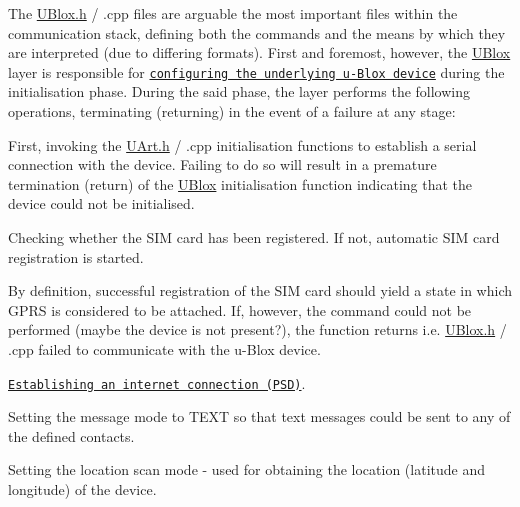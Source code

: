 The \hyperlink{_u_blox_8h}{U\+Blox.\+h} / .cpp files are arguable the most important files within the communication stack, defining both the commands and the means by which they are interpreted (due to differing formats). First and foremost, however, the \hyperlink{class_u_blox}{U\+Blox} layer is responsible for \href{https://github.com/itsBelinda/ENG5220-2020-Team13/wiki/uBlox-and-CellLocate}{\tt configuring the underlying u-\/\+Blox device} during the initialisation phase. During the said phase, the layer performs the following operations, terminating (returning) in the event of a failure at any stage\+:


\begin{DoxyItemize}
\item First, invoking the \hyperlink{_u_art_8h}{U\+Art.\+h} / .cpp initialisation functions to establish a serial connection with the device. Failing to do so will result in a premature termination (return) of the \hyperlink{class_u_blox}{U\+Blox} initialisation function indicating that the device could not be initialised.
\item Checking whether the S\+IM card has been registered. If not, automatic S\+IM card registration is started.
\item By definition, successful registration of the S\+IM card should yield a state in which G\+P\+RS is considered to be \textquotesingle{}attached\textquotesingle{}. If, however, the command could not be performed (maybe the device is not present?), the function returns i.\+e. \hyperlink{_u_blox_8h}{U\+Blox.\+h} / .cpp failed to communicate with the u-\/\+Blox device.
\item \href{https://github.com/itsBelinda/ENG5220-2020-Team13/wiki/uBlox-and-CellLocate}{\tt Establishing an internet connection (P\+SD)}.
\item Setting the message mode to T\+E\+XT so that text messages could be sent to any of the defined contacts.
\item Setting the location scan mode -\/ used for obtaining the location (latitude and longitude) of the device.
\end{DoxyItemize}

